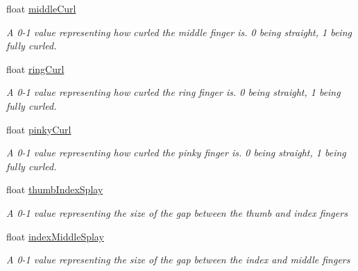\begin{DoxyCompactItemize}
float \mbox{\hyperlink{interface_valve_1_1_v_r_1_1_i_steam_v_r___action___skeleton___source_ab1dd2b18c084b3a75008a1033312e417}{middle\+Curl}}
\begin{DoxyCompactList}\small\item\em A 0-\/1 value representing how curled the middle finger is. 0 being straight, 1 being fully curled. \end{DoxyCompactList}\item 
float \mbox{\hyperlink{interface_valve_1_1_v_r_1_1_i_steam_v_r___action___skeleton___source_a06207e77ee749ea4db3b72bb24a3b62d}{ring\+Curl}}
\begin{DoxyCompactList}\small\item\em A 0-\/1 value representing how curled the ring finger is. 0 being straight, 1 being fully curled. \end{DoxyCompactList}\item 
float \mbox{\hyperlink{interface_valve_1_1_v_r_1_1_i_steam_v_r___action___skeleton___source_a87e1f1563f88552a6e9089020d43137b}{pinky\+Curl}}
\begin{DoxyCompactList}\small\item\em A 0-\/1 value representing how curled the pinky finger is. 0 being straight, 1 being fully curled. \end{DoxyCompactList}\item 
float \mbox{\hyperlink{interface_valve_1_1_v_r_1_1_i_steam_v_r___action___skeleton___source_a64b2ba19df21ca74bc15bb9d44351824}{thumb\+Index\+Splay}}
\begin{DoxyCompactList}\small\item\em A 0-\/1 value representing the size of the gap between the thumb and index fingers \end{DoxyCompactList}\item 
float \mbox{\hyperlink{interface_valve_1_1_v_r_1_1_i_steam_v_r___action___skeleton___source_a2862a4c4a23cf23cca1c354cd1c9daef}{index\+Middle\+Splay}}
\begin{DoxyCompactList}\small\item\em A 0-\/1 value representing the size of the gap between the index and middle fingers \end{DoxyCompactList}\item 

\end{DoxyCompactItemize}
